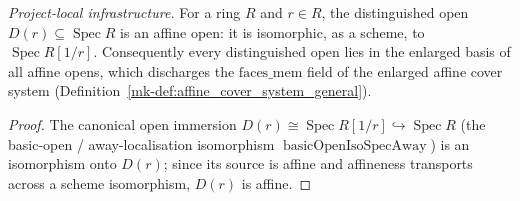 \begin{lemma}\label{mk-lem:isAffineOpen_specBasicOpen}
  \leanok

  \textit{Project-local infrastructure.}
  For a ring \(R\) and \(r \in R\), the distinguished open \(D(r) \subseteq \operatorname{Spec} R\) is an
  affine open: it is isomorphic, as a scheme, to \(\operatorname{Spec} R[1/r]\). Consequently every
  distinguished open lies in the enlarged basis of all affine opens, which discharges the
  \(\mathrm{faces\_mem}\) field of the enlarged affine cover system
  (Definition~\ref{mk-def:affine_cover_system_general}).
\end{lemma}
\begin{proof}
  \leanok


The canonical open immersion \(D(r) \cong \operatorname{Spec} R[1/r] \hookrightarrow \operatorname{Spec}
  R\) (the basic-open / away-localisation isomorphism \(\operatorname{basicOpenIsoSpecAway}\)) is an
  isomorphism onto \(D(r)\); since its source is affine and affineness transports across a scheme
  isomorphism, \(D(r)\) is affine.
\end{proof}

